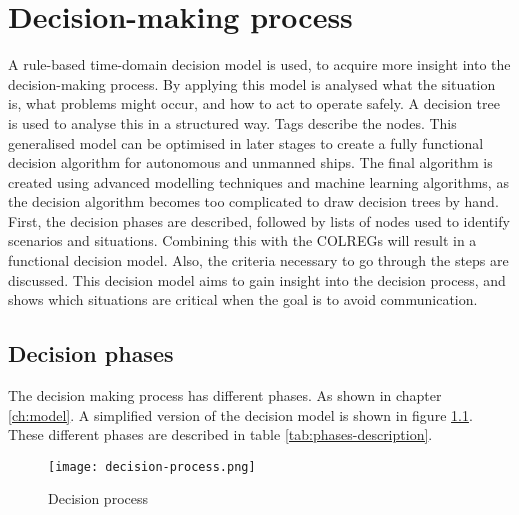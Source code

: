 \chapter{ Decision-making process}
\label{ch:decision-process}
A rule-based time-domain decision model is used, to acquire more insight into the decision-making process. By applying this model is analysed what the situation is, what problems might occur, and how to act to operate safely. A decision tree is used to analyse this in a structured way. Tags describe the nodes. This generalised model can be optimised in later stages to create a fully functional decision algorithm for autonomous and unmanned ships. The final algorithm is created using advanced modelling techniques and machine learning algorithms, as the decision algorithm becomes too complicated to draw decision trees by hand. First, the decision phases are described, followed by lists of nodes used to identify scenarios and situations. Combining this with the COLREGs will result in a functional decision model. Also, the criteria necessary to go through the steps are discussed. This decision model aims to gain insight into the decision process, and shows which situations are critical when the goal is to avoid communication.

\section{Decision phases}
The decision making process has different phases. As shown in chapter \ref{ch:model}. A simplified version of the decision model is shown in figure \ref{fig:decision-process}. These different phases are described in table \ref{tab:phases-description}.

\begin{figure}[hb]
	\centering
	\texttt{[image: decision-process.png]}
	\caption{Decision process}
	\label{fig:decision-process}
\end{figure}


